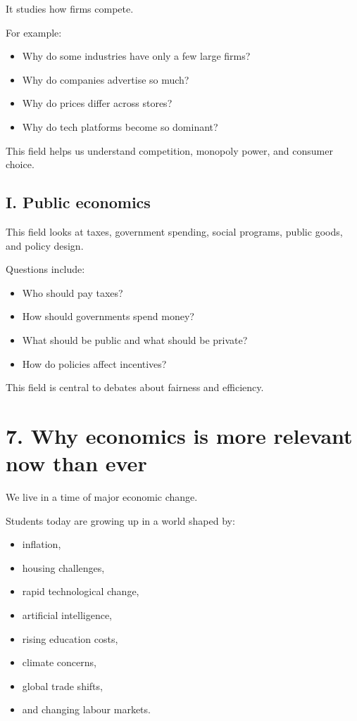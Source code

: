 \documentclass[12pt]{article}
\begin{document}
It studies how firms compete.

For example:
\begin{itemize}[leftmargin=2em]
    \item Why do some industries have only a few large firms?
    \item Why do companies advertise so much?
    \item Why do prices differ across stores?
    \item Why do tech platforms become so dominant?
\end{itemize}

This field helps us understand competition, monopoly power, and consumer choice.

\subsection*{I. Public economics}

This field looks at taxes, government spending, social programs, public goods, and policy design.

Questions include:
\begin{itemize}[leftmargin=2em]
    \item Who should pay taxes?
    \item How should governments spend money?
    \item What should be public and what should be private?
    \item How do policies affect incentives?
\end{itemize}

This field is central to debates about fairness and efficiency.

\section*{7. Why economics is more relevant now than ever}

We live in a time of major economic change.

Students today are growing up in a world shaped by:
\begin{itemize}[leftmargin=2em]
    \item inflation,
    \item housing challenges,
    \item rapid technological change,
    \item artificial intelligence,
    \item rising education costs,
    \item climate concerns,
    \item global trade shifts,
    \item and changing labour markets.
\end{itemize}
\end{document}
